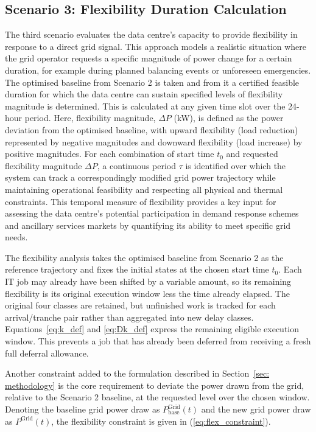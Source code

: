 \documentclass[lettersize,journal]{IEEEtran}
\begin{document}


\subsection{Scenario 3: Flexibility Duration Calculation}\label{sec:scenario 3}
The third scenario evaluates the data centre's capacity to provide flexibility in response to a direct grid signal. This approach models a realistic situation where the grid operator requests a specific magnitude of power change for a certain duration, for example during planned balancing events or unforeseen emergencies. The optimised baseline from Scenario 2 is taken and from it a certified feasible duration for which the data centre can sustain specified levels of flexibility magnitude is determined. This is calculated at any given time slot over the 24-hour period. Here, flexibility magnitude, $\Delta P$ (kW), is defined as the power deviation from the optimised baseline, with upward flexibility (load reduction) represented by negative magnitudes and downward flexibility (load increase) by positive magnitudes. For each combination of start time $t_0$ and requested flexibility magnitude $\Delta P$, a continuous period $\tau$ is identified over which the system can track a correspondingly modified grid power trajectory while maintaining operational feasibility and respecting all physical and thermal constraints. This temporal measure of flexibility provides a key input for assessing the data centre's potential participation in demand response schemes and ancillary services markets by quantifying its ability to meet specific grid needs.

The flexibility analysis takes the optimised baseline from Scenario 2 as the reference trajectory and fixes the initial states at the chosen start time $t_0$. Each IT job may already have been shifted by a variable amount, so its remaining flexibility is its original execution window less the time already elapsed. The original four classes are retained, but unfinished work is tracked for each arrival/tranche pair rather than aggregated into new delay classes. Equations~\eqref{eq:k_def} and \eqref{eq:Dk_def} express the remaining eligible execution window. This prevents a job that has already been deferred from receiving a fresh full deferral allowance.

Another constraint added to the formulation described in Section~\ref{sec: methodology} is the core requirement to deviate the power drawn from the grid, relative to the Scenario 2 baseline, at the requested level over the chosen window. Denoting the baseline grid power draw as $P^{\mathrm{Grid}}_{\mathrm{base}}(t)$ and the new grid power draw as $P^{\mathrm{Grid}}(t)$, the flexibility constraint is given in (\ref{eq:flex_constraint}).
\end{document}
